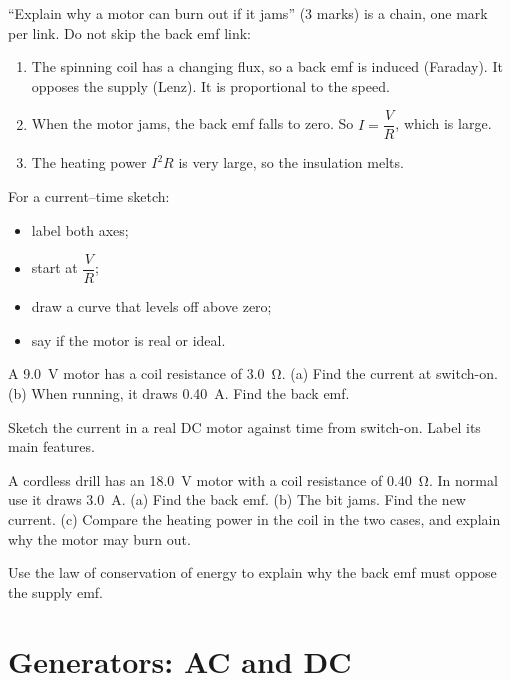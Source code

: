 \begin{examtip}
``Explain why a motor can burn out if it jams'' (3 marks) is a chain, one mark per link.
Do not skip the back emf link:
\begin{enumerate}
  \item The spinning coil has a changing flux, so a back emf is induced (Faraday). It
        opposes the supply (Lenz). It is proportional to the speed.
  \item When the motor jams, the back emf falls to zero. So $I = \dfrac{V}{R}$, which is
        large.
  \item The heating power $I^2R$ is very large, so the insulation melts.
\end{enumerate}
For a current--time sketch:
\begin{itemize}
  \item label both axes;
  \item start at $\dfrac{V}{R}$;
  \item draw a curve that levels off above zero;
  \item say if the motor is real or ideal.
\end{itemize}
\end{examtip}

\begin{quickcheck}
  \item A \qty{9.0}{V} motor has a coil resistance of \qty{3.0}{\ohm}. (a) Find the
        current at switch-on. (b) When running, it draws \qty{0.40}{A}. Find the back emf.
  \item Sketch the current in a real DC motor against time from switch-on. Label its
        main features.
  \item A cordless drill has an \qty{18.0}{V} motor with a coil resistance of
        \qty{0.40}{\ohm}. In normal use it draws \qty{3.0}{A}. (a) Find the back emf.
        (b) The bit jams. Find the new current. (c) Compare the heating power in the
        coil in the two cases, and explain why the motor may burn out.
  \item Use the law of conservation of energy to explain why the back emf must oppose
        the supply emf.
\end{quickcheck}

\section{Generators: AC and DC}\label{ch5:sec:generators}

